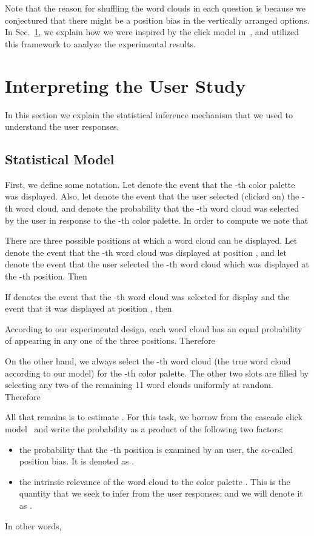 \documentclass[prodmode,acmtochi]{acmsmall}
\begin{document}
Note that the reason for shuffling the word clouds in each question is because we
conjectured that there might be a position bias in the vertically arranged
options.  In Sec.~\ref{sec:InterpretingTheUserStudy}, we explain how we were inspired by
the click model in~\cite{govindaraj2014modeling}, and utilized this
framework to analyze the experimental results.



\section{Interpreting the User Study}
\label{sec:InterpretingTheUserStudy}
In this section we explain the statistical inference mechanism that we
used to understand the user responses.

\subsection{Statistical Model}

First, we define some notation. Let  denote the event that the
-th color palette was displayed. Also, let  denote the
event that the user selected (clicked on) the -th word cloud, and
 denote the probability that the -th word cloud was selected by the user in response to the -th color palette.
In order to compute  we note that

There are three possible positions  at which a word
cloud can be displayed. Let  denote the event that the -th
word cloud was displayed at position , and let  denote the
event that the user selected the -th word cloud which was displayed
at the -th position. Then

If  denotes the event that the -th word cloud was selected
for display and  the event that it was displayed at position ,
then

According to our experimental design, each word cloud has an equal
probability of appearing in any one of the three positions. Therefore

On the other hand, we always select the -th word cloud (the true word
cloud according to our model) for the -th color palette. The other two
slots are filled by selecting any two of the remaining 11 word clouds
uniformly at random. Therefore



All that remains is to estimate . For
this task, we borrow from the cascade click model~\cite{govindaraj2014modeling} and
write the probability as a product of the following two factors:
\begin{itemize}
\item the probability that the -th position is examined by an user,
  the so-called position bias. It is denoted as .
\item the intrinsic relevance of the word cloud  to the color palette
  . This is the quantity that we seek to infer from the user
  responses; and we will denote it as .
\end{itemize}
In other words,
\end{document}
